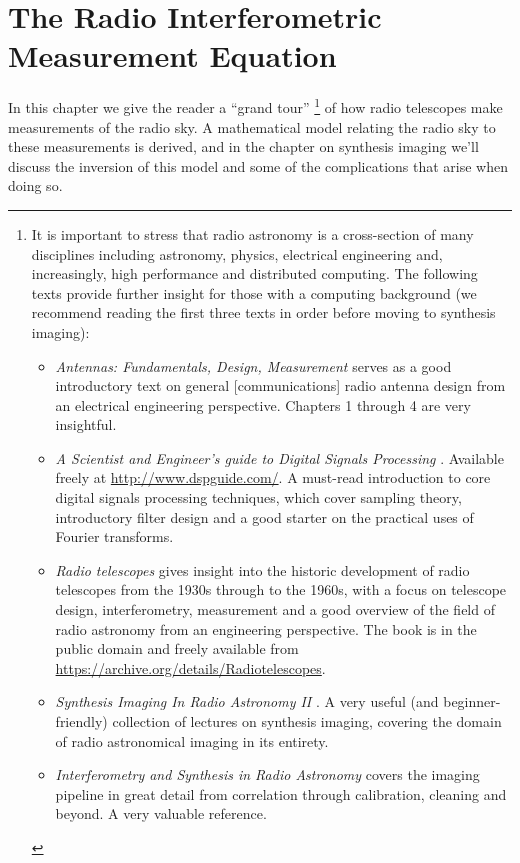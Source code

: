 \chapter{The Radio Interferometric Measurement Equation}
In this chapter we give the reader a ``grand tour'' \footnote{It is important to stress that radio astronomy is a cross-section of many disciplines including astronomy, physics, 
electrical engineering and, increasingly, high performance and distributed computing. The following texts provide further insight for those with a computing background (we recommend 
reading the first three texts in order before moving to synthesis imaging):
\begin{itemize}
 \item \textit{Antennas: Fundamentals, Design, Measurement} \cite{blake2009antennas} serves as a good introductory text on general [communications] radio antenna design from an electrical engineering perspective. Chapters 1 through 4
 are very insightful.
 \item \textit{A Scientist and Engineer's guide to Digital Signals Processing} \cite{smith1997scientist}. Available freely at \url{http://www.dspguide.com/}. A must-read introduction to core digital 
 signals processing techniques, which cover sampling theory, introductory filter design and a good starter on the practical uses of Fourier transforms.
 \item \textit{Radio telescopes} \cite{christiansenradiotelescopes} gives insight into the historic development of radio telescopes from the 1930s through to the 1960s, with a focus on telescope design, interferometry, measurement and a 
 good overview of the field of radio astronomy from an engineering perspective. The book is in the public domain and freely available from \url{https://archive.org/details/Radiotelescopes}.
 \item \textit{Synthesis Imaging In Radio Astronomy II} \cite{taylor1999synthesis}. A very useful (and beginner-friendly) collection of lectures on synthesis imaging, covering the domain of radio astronomical imaging 
 in its entirety.
 \item \textit{Interferometry and Synthesis in Radio Astronomy} \cite{thompson2008interferometry} covers the imaging pipeline in great detail from correlation through calibration, cleaning
 and beyond. A very valuable reference.
\end{itemize}
} of how radio telescopes make measurements of the radio sky. A mathematical model relating the radio sky to these measurements is derived,
and in the chapter on synthesis imaging we'll discuss the inversion of this model and some of the complications that arise when doing so.
